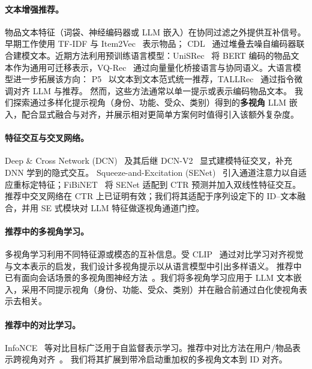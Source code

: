 \documentclass[sigconf,natbib=true,anonymous]{acmart}
\newcommand{\llm}{\textsc{LLM}\xspace}
\newcommand{\InfoNCE}{InfoNCE\xspace}
\begin{document}
\paragraph{文本增强推荐。}
\begin{sloppypar}
物品文本特征（词袋、神经编码器或 \llm 嵌入）在协同过滤之外提供互补信号。早期工作使用 TF-IDF 与 Item2Vec~\cite{barkan2016item2vec} 表示物品；
CDL~\cite{wang2015cdl} 通过堆叠去噪自编码器联合建模文本。近期方法利用预训练语言模型：UniSRec~\cite{hou2022unisrec} 将 BERT 编码的物品文本作为通用可迁移表示，VQ-Rec~\cite{hou2023vqrec} 通过向量量化桥接语言与协同语义。大语言模型进一步拓展该方向：
P5~\cite{geng2022p5} 以文本到文本范式统一推荐，TALLRec~\cite{bao2023tallrec} 通过指令微调对齐 LLM 与推荐。
然而，这些方法通常以单一提示或表示编码物品文本。
我们探索通过多样化提示视角（身份、功能、受众、类别）得到的\textbf{多视角} \llm 嵌入，配合显式融合与对齐，并展示相对更简单方案何时值得引入该额外复杂度。
\end{sloppypar}

\paragraph{特征交互与交叉网络。}
Deep \& Cross Network (DCN)~\cite{wang2017dcn} 及其后继 DCN-V2~\cite{wang2021dcnv2} 显式建模特征交叉，补充 DNN 学到的隐式交互。
Squeeze-and-Excitation (SENet)~\cite{hu2018senet} 引入通道注意力以自适应重标定特征；FiBiNET~\cite{huang2019fibinet} 将 SENet 适配到 CTR 预测并加入双线性特征交互。
推荐中交叉网络在 CTR 上已证明有效；我们将其适配于序列设定下的 ID--文本融合，并用 SE 式模块对 \llm 特征做逐视角通道门控。

\paragraph{推荐中的多视角学习。}
多视角学习利用不同特征源或模态的互补信息。受 CLIP~\cite{radford2021clip} 通过对比学习对齐视觉与文本表示的启发，我们设计多视角提示以从语言模型中引出多样语义。
推荐中已有面向会话场景的多视角图神经方法~\cite{huang2025mvcgnn_session}。我们将多视角学习应用于 \llm 文本嵌入，采用不同提示视角（身份、功能、受众、类别）并在融合前通过白化使视角表示去相关。

\paragraph{推荐中的对比学习。}
\InfoNCE~\cite{oord2018cpc} 等对比目标广泛用于自监督表示学习。推荐中对比方法在用户/物品表示跨视角对齐~\cite{wu2021cl4rec}。
我们将其扩展到带冷启动重加权的多视角文本到 ID 对齐。
\end{document}
